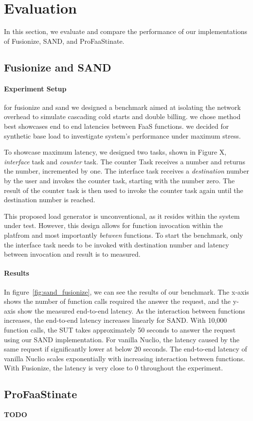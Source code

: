 \section{Evaluation}\label{sec:evaluation}

In this section, we evaluate and compare the performance of our implementations of Fusionize, SAND, and ProFaaStinate.

\subsection{Fusionize and SAND}

%
%

\paragraph{Experiment Setup}

for fusionize and sand we designed a benchmark aimed at isolating the network overhead to simulate cascading cold starts and double billing.
we chose method best showcases end to end latencies between FaaS functions. 
we decided for synthetic base load to investigate system's performance under maximum stress.
                                                                               
To showcase maximum latency, we designed two tasks, shown in Figure X, \emph{interface} task and \emph{counter} task. 
The counter Task receives a number and returns the number, incremented by one. 
The interface task receives a \emph{destination} number by the user and invokes the counter task, starting with the number zero. 
The result of the counter task is then used to invoke the counter task again until the destination number is reached.
                                                                               
This proposed load generator is unconventional, as it resides within the system under test. 
However, this design allows for function invocation within the platfrom and most importantly \emph{between} functions. 
To start the benchmark, only the interface task needs to be invoked with destination number and latency between invocation and result is to measured.

%
%

\paragraph{Results}

In figure~\ref{fig:sand_fusionize}, we can see the results of our benchmark. 
The x-axis shows the number of function calls required the answer the request, and the y-axis show the measured end-to-end latency.
As the interaction between functions increases, the end-to-end latency increases linearly for SAND. 
With 10,000 function calls, the SUT takes approximately 50 seconds to answer the request using our SAND implementation.
For vanilla Nuclio, the latency caused by the same request if significantly lower at below 20 seconds.
The end-to-end latency of vanilla Nuclio scales exponentially with increasing interaction between functions.
With Fusionize, the latency is very close to 0 throughout the experiment.

\subsection{ProFaaStinate}

%
%

\textbf{TODO}
